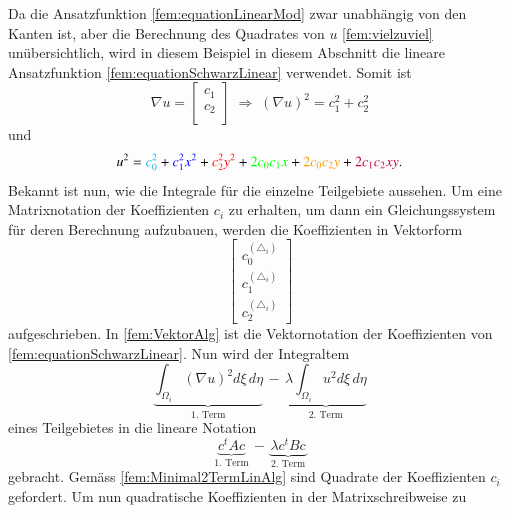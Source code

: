 Da die Ansatzfunktion \eqref{fem:equationLinearMod} zwar unabhängig
von den Kanten ist, aber die Berechnung des Quadrates von $u$
\eqref{fem:vielzuviel} unübersichtlich, wird in diesem Beispiel in
diesem Abschnitt die lineare Ansatzfunktion
\eqref{fem:equationSchwarzLinear} verwendet.
Somit ist
\begin{equation}
	\nabla u = 	
	\left[ \begin{array}{r}
	c_1 \\
	c_2 \\
	\end{array}\right] \; \Longrightarrow \; (\nabla u)^2 = c_1^2 + c_2^2
	\label{fem:equationSchwarzquadratischPP}
\end{equation}  
und 
\begin{equation}
 	u^2 = \textcolor{cyan}{c_0^2} + \textcolor{blue}{c_1^2 x^2} + \textcolor{red}{c_2^2 y^2} + \textcolor{green}{2 c_0 c_1 x} + \textcolor{orange}{2 c_0 c_2 y} +\textcolor{purple}{ 2 c_1 c_2 xy}.
	\label{fem:equationSchwarzquadratischQQQ}
\end{equation}  
Bekannt ist nun, wie die Integrale für die einzelne Teilgebiete aussehen.
Um eine Matrixnotation der Koeffizienten $c_i$ zu erhalten, um dann
ein Gleichungssystem für deren Berechnung aufzubauen, werden die
Koeffizienten in Vektorform
\begin{equation}
	\begin{bmatrix}
	c_0^{(\triangle_i)}  \\
	c_1^{(\triangle_i)} \\
	c_2^{(\triangle_i)}
	\end{bmatrix}
	\label{fem:VektorAlg}
\end{equation}
aufgeschrieben.
In \eqref{fem:VektorAlg} ist die Vektornotation der Koeffizienten
von \eqref{fem:equationSchwarzLinear}.
Nun wird der Integraltem
\begin{equation}
			\underbrace{ \int_{\Omega_i} (\nabla u)^2 d\xi \, d\eta}_{\text{1.~Term}} \, -  \, \underbrace{\lambda \int_{\Omega_i} u^2 d\xi \,d\eta}_{\text{2.~Term}}
			\label{fem:Minimal2TermLinAlg}
\end{equation}
eines Teilgebietes in die lineare Notation
\begin{equation}
			\underbrace{ c^t Ac}_{\text{1.~Term}} \, - \, \underbrace{\lambda c^t Bc}_{\text{2.~Term}}
			\label{fem:Minimal2LinAlg}
\end{equation}
gebracht.
Gemäss \eqref{fem:Minimal2TermLinAlg} sind Quadrate der Koeffizienten
$c_i$ gefordert.
Um nun quadratische Koeffizienten in der Matrixschreibweise zu
